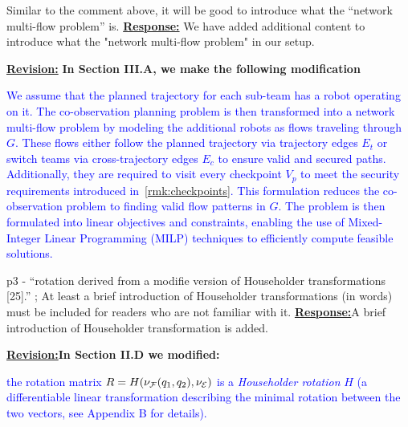 \documentclass{article}
\newcommand{\re}{\tcblower \underline{\textbf{Response:}}\quad}
\newcommand{\rv}{{\large{\underline{\textbf{Revision:}}}}\quad}
\newcommand{\new}[1]{\textcolor{blue}{#1}}
\begin{document}
\begin{cmt}{}{}
	Similar to the comment above, it will be good to introduce what the
“network multi-flow problem” is.
\re 
We have added additional content to introduce what the "network multi-flow problem" in our setup.
\end{cmt}
\rv 
\textbf{In Section III.A, we make the following modification}

\new{We assume that the planned trajectory for each sub-team has a robot operating on it. The co-observation planning problem is then transformed into a network multi-flow problem by modeling the additional robots as flows traveling through $G$. These flows either follow the planned trajectory via trajectory edges $E_t$ or switch teams via cross-trajectory edges $E_c$ to ensure valid and secured paths. Additionally, they are required to visit every checkpoint $V_p$ to meet the security requirements introduced in~\ref{rmk:checkpoints}. This formulation reduces the co-observation problem to finding valid flow patterns in $G$. The problem is then formulated into linear objectives and constraints, enabling the use of Mixed-Integer Linear Programming (MILP) techniques to efficiently compute feasible solutions. }

\begin{cmt}{}{}
	p3 - “rotation derived from a modifie version of Householder
transformations [25].” ; At least a brief introduction of
Householder transformations (in words) must be included for readers who
are not familiar with it.
\re A brief introduction of Householder transformation is added.
\end{cmt}
\rv \textbf{In Section II.D we modified:}

\new{the rotation matrix $R=H(\nu_{\mathcal{F}}(q_1,q_2),\nu_{\mathcal{E}})$ is a \emph{Householder rotation} $H$ (a differentiable linear transformation describing the minimal rotation between the two vectors, see Appendix B for details).}
\end{document}
